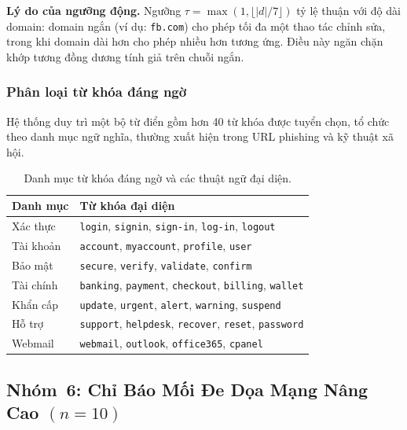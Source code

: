 \documentclass[a4paper,12pt]{article}
\begin{document}
\textbf{Lý do của ngưỡng động.} Ngưỡng $\tau = \max(1, \lfloor |d|/7 \rfloor)$ tỷ lệ thuận với độ dài domain: domain ngắn (ví dụ: \texttt{fb.com}) cho phép tối đa một thao tác chỉnh sửa, trong khi domain dài hơn cho phép nhiều hơn tương ứng. Điều này ngăn chặn khớp tương đồng dương tính giả trên chuỗi ngắn.

\subsubsection{Phân loại từ khóa đáng ngờ}

Hệ thống duy trì một bộ từ điển gồm hơn 40 từ khóa được tuyển chọn, tổ chức theo danh mục ngữ nghĩa, thường xuất hiện trong URL phishing và kỹ thuật xã hội.

\begin{table}[H]
\centering
\caption{Danh mục từ khóa đáng ngờ và các thuật ngữ đại diện.}
\label{tab:keywords}
\begin{tabular}{ll}
\toprule
\textbf{Danh mục} & \textbf{Từ khóa đại diện} \\
\midrule
Xác thực    & \texttt{login}, \texttt{signin}, \texttt{sign-in}, \texttt{log-in}, \texttt{logout} \\
Tài khoản   & \texttt{account}, \texttt{myaccount}, \texttt{profile}, \texttt{user} \\
Bảo mật     & \texttt{secure}, \texttt{verify}, \texttt{validate}, \texttt{confirm} \\
Tài chính   & \texttt{banking}, \texttt{payment}, \texttt{checkout}, \texttt{billing}, \texttt{wallet} \\
Khẩn cấp    & \texttt{update}, \texttt{urgent}, \texttt{alert}, \texttt{warning}, \texttt{suspend} \\
Hỗ trợ      & \texttt{support}, \texttt{helpdesk}, \texttt{recover}, \texttt{reset}, \texttt{password} \\
Webmail     & \texttt{webmail}, \texttt{outlook}, \texttt{office365}, \texttt{cpanel} \\
\bottomrule
\end{tabular}
\end{table}

\subsection{Nhóm~6: Chỉ Báo Mối Đe Dọa Mạng Nâng Cao \texorpdfstring{$(n=10)$}{(n=10)}}
\label{sec:feat_advanced}
\end{document}
